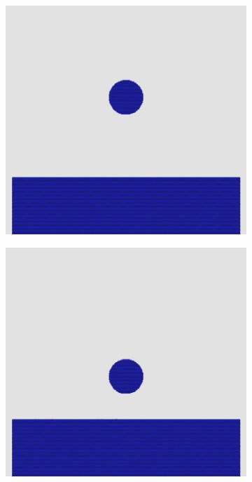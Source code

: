\documentclass[12pt,a4paper,dvipsnames]{article}
\begin{document}
\begin{figure}[!h] \centering
	\begin{subfigure}[!h]{0.3\textwidth} \centering
		\includegraphics[width=\textwidth]{WD/WD-01.jpg}
	\end{subfigure}
    \begin{subfigure}[!h]{0.3\textwidth} \centering
		\includegraphics[width=\textwidth]{WD/WD-02.jpg}

\end{subfigure}
\end{figure}
\end{document}

